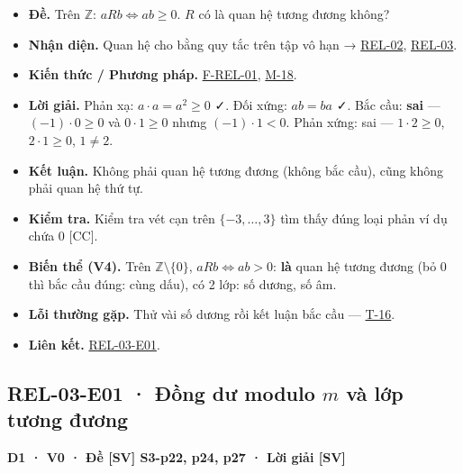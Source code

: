 \documentclass[
  10pt,
  twoside,openany]{book}
\providecommand{\tightlist}{%
  \setlength{\itemsep}{0pt}\setlength{\parskip}{0pt}}
\begin{document}
\begin{itemize}
\tightlist
\item
  \textbf{Đề.} Trên \(\mathbb Z\): \(aRb\Leftrightarrow ab\ge0\). \(R\)
  có là quan hệ tương đương không?
\item
  \textbf{Nhận diện.} Quan hệ cho bằng quy tắc trên tập vô hạn →
  \protect\hyperlink{REL-02}{REL-02},
  \protect\hyperlink{REL-03}{REL-03}.
\item
  \textbf{Kiến thức / Phương pháp.}
  \protect\hyperlink{F-REL-01}{F-REL-01},
  \protect\hyperlink{M-18}{M-18}.
\item
  \textbf{Lời giải.} Phản xạ: \(a\cdot a=a^2\ge0\) ✓. Đối xứng:
  \(ab=ba\) ✓. Bắc cầu: \textbf{sai} --- \((-1)\cdot0\ge0\) và
  \(0\cdot1\ge0\) nhưng \((-1)\cdot1<0\). Phản xứng: sai ---
  \(1\cdot2\ge0\), \(2\cdot1\ge0\), \(1\ne2\).
\item
  \textbf{Kết luận.} Không phải quan hệ tương đương (không bắc cầu),
  cũng không phải quan hệ thứ tự.
\item
  \textbf{Kiểm tra.} Kiểm tra vét cạn trên \(\{-3,\dots,3\}\) tìm thấy
  đúng loại phản ví dụ chứa 0 {[}CC{]}.
\item
  \textbf{Biến thể (V4).} Trên \(\mathbb Z\setminus\{0\}\),
  \(aRb\Leftrightarrow ab>0\): \textbf{là} quan hệ tương đương (bỏ 0 thì
  bắc cầu đúng: cùng dấu), có 2 lớp: số dương, số âm.
\item
  \textbf{Lỗi thường gặp.} Thử vài số dương rồi kết luận bắc cầu ---
  \protect\hyperlink{T-16}{T-16}.
\item
  \textbf{Liên kết.} \protect\hyperlink{REL-03-E01}{REL-03-E01}.
\end{itemize}

\hypertarget{REL-03-E01}{%
\subsection{\texorpdfstring{REL-03-E01 · Đồng dư modulo \(m\) và lớp
tương
đương}{REL-03-E01 · Đồng dư modulo m và lớp tương đương}}\label{REL-03-E01}}

\textbf{D1 · V0 · Đề {[}SV{]} S3-p22, p24, p27 · Lời giải {[}SV{]}}
\end{document}
